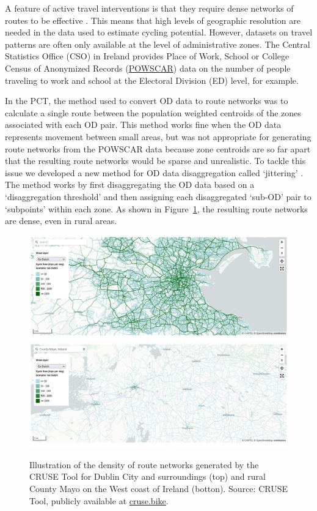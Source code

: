 \documentclass[
  super,
  preprint,
  3p]{elsarticle}
\begin{document}
A feature of active travel interventions is that they require dense
networks of routes to be effective \citep{parkin2018}. This means that
high levels of geographic resolution are needed in the data used to
estimate cycling potential. However, datasets on travel patterns are
often only available at the level of administrative zones. The Central
Statistics Office (CSO) in Ireland provides Place of Work, School or
College Census of Anonymized Records
(\href{https://www.cso.ie/en/census/census2016reports/powscar/}{POWSCAR})
data on the number of people traveling to work and school at the
Electoral Division (ED) level, for example.

In the PCT, the method used to convert OD data to route networks was to
calculate a single route between the population weighted centroids of
the zones associated with each OD pair. This method works fine when the
OD data represents movement between small areas, but was not appropriate
for generating route networks from the POWSCAR data because zone
centroids are so far apart that the resulting route networks would be
sparse and unrealistic. To tackle this issue we developed a new method
for OD data disaggregation called `jittering' \citep{lovelace2022}. The
method works by first disaggregating the OD data based on a
`disaggregation threshold' and then assigning each disaggregated
`sub-OD' pair to `subpoints' within each zone. As shown in
Figure~\ref{fig-dublin}, the resulting route networks are dense, even in
rural areas.

\begin{figure}

{\centering 

\includegraphics{images/paste-8.png}
\includegraphics{images/paste-9.png}

}

\caption{\label{fig-dublin}Illustration of the density of route networks
generated by the CRUSE Tool for Dublin City and surroundings (top) and
rural County Mayo on the West coast of Ireland (botton). Source: CRUSE
Tool, publicly available at \href{https://cruse.bike/}{cruse.bike}.}

\end{figure}
\end{document}

